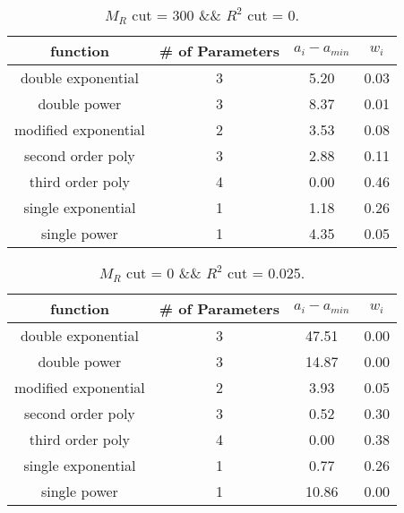  
\begin{table}[H] 
\begin{center} 
\begin{tabular}{|c|c|c|c|} 
\hline function & \# of Parameters & $a_i-a_{min}$ & $w_i$ \\ \hline 
double exponential &  3 &   5.20 &   0.03 \\ 
double power &  3 &   8.37 &   0.01 \\ 
modified exponential &  2 &   3.53 &   0.08 \\ 
second order poly &  3 &   2.88 &   0.11 \\ 
third order poly &  4 &   0.00 &   0.46 \\ 
single exponential &  1 &   1.18 &   0.26 \\ 
single power &  1 &   4.35 &   0.05 \\ 
\hline 
\end{tabular} 
\caption{$M_R$ cut = 300 \&\& $R^2$ cut = 0.} 
\label{tab:FitChoices_300_0} 
\end{center} 
\end{table} 
 
 
\begin{table}[H] 
\begin{center} 
\begin{tabular}{|c|c|c|c|} 
\hline function & \# of Parameters & $a_i-a_{min}$ & $w_i$ \\ \hline 
double exponential &  3 &  47.51 &   0.00 \\ 
double power &  3 &  14.87 &   0.00 \\ 
modified exponential &  2 &   3.93 &   0.05 \\ 
second order poly &  3 &   0.52 &   0.30 \\ 
third order poly &  4 &   0.00 &   0.38 \\ 
single exponential &  1 &   0.77 &   0.26 \\ 
single power &  1 &  10.86 &   0.00 \\ 
\hline 
\end{tabular} 
\caption{$M_R$ cut = 0 \&\& $R^2$ cut = 0.025.} 
\label{tab:FitChoices_0_0.025} 
\end{center} 
\end{table} 
 
